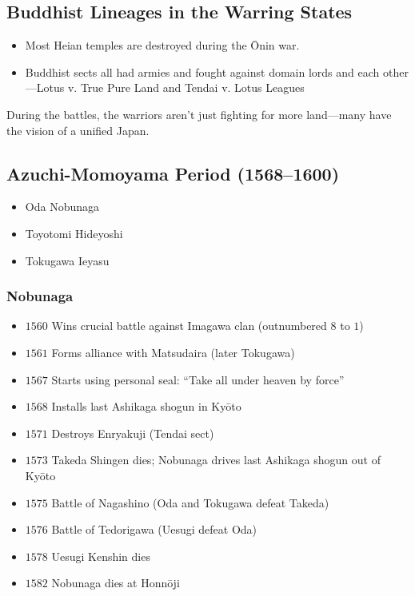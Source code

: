 \documentclass[class=article, crop=false]{standalone}
\begin{document}
  \subsection{Buddhist Lineages in the Warring States}
  \begin{itemize}
    \item Most Heian temples are destroyed during the \=Onin war.
    \item Buddhist sects all had armies and fought against domain lords and each other---Lotus v. True Pure Land and Tendai v. Lotus Leagues
  \end{itemize}
  \begin{note}{}
    During the battles, the warriors aren't just fighting for more land---many have the vision of a unified Japan.
  \end{note}
  \subsection{Azuchi-Momoyama Period (1568--1600)}
  \begin{itemize}
    \item Oda Nobunaga
    \item Toyotomi Hideyoshi
    \item Tokugawa Ieyasu
  \end{itemize}
  \subsubsection{Nobunaga}
  \begin{itemize}
    \item $1560$ Wins crucial battle against Imagawa clan (outnumbered $8$ to $1$)
    \item $1561$ Forms alliance with Matsudaira (later Tokugawa)
    \item $1567$ Starts using personal seal: ``Take all under heaven by force''
    \item $1568$ Installs last Ashikaga shogun in Ky\=oto
    \item $1571$ Destroys Enryakuji (Tendai sect)
    \item $1573$ Takeda Shingen dies; Nobunaga drives last Ashikaga shogun out of Ky\=oto
    \item $1575$ Battle of Nagashino (Oda and Tokugawa defeat Takeda)
    \item $1576$ Battle of Tedorigawa (Uesugi defeat Oda)
    \item $1578$ Uesugi Kenshin dies
    \item $1582$ Nobunaga dies at Honn\=oji
  \end{itemize}
\end{document}
